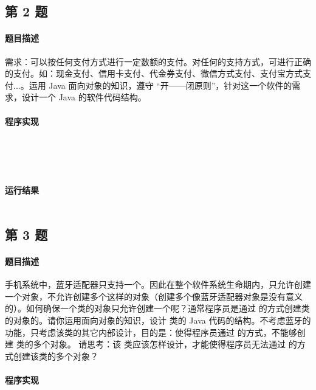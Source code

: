 \documentclass{academics}
\begin{document}
\subsection{第 2 题}

\paragraph{题目描述} {
    需求：可以按任何支付方式进行一定数额的支付。对任何的支持方式，可进行正确的支付。如：现金支付、信用卡支付、代金券支付、微信方式支付、支付宝方式支付...。运用 Java 面向对象的知识，遵守 ``开——闭原则''，针对这一个软件的需求，设计一个 Java 的软件代码结构。
}

\paragraph{程序实现} {
    \inputminted[label=PayResult.java]{java}{../src/P02/PayResult.java}
    \inputminted[label=Payment.java]{java}{../src/P02/Payment.java}
    \inputminted[label=CashPayment.java]{java}{../src/P02/CashPayment.java}
    \inputminted[label=WechatPayment.java]{java}{../src/P02/WechatPayment.java}
    \inputminted[label=Main.java]{java}{../src/P02/Main.java}
}

\paragraph{运行结果} {
    \inputminted{text}{../res/P02.out}
}

\subsection{第 3 题}

\paragraph{题目描述} {
    手机系统中，蓝牙适配器只支持一个。因此在整个软件系统生命期内，只允许创建一个对象，不允许创建多个这样的对象（创建多个像蓝牙适配器对象是没有意义的）。如何确保一个类的对象只允许创建一个呢？通常程序员是通过  的方式创建类的对象的。请你运用面向对象的知识，设计  类的 Java 代码的结构。不考虑蓝牙的功能，只考虑该类的其它内部设计，目的是：使得程序员通过  的方式，不能够创建  类的多个对象。 请思考：该  类应该怎样设计，才能使得程序员无法通过  的方式创建该类的多个对象？
}

\paragraph{程序实现} {
    \inputminted[label=BluetoothAdapter.java]{java}{../src/P03/BluetoothAdapter.java}
    \inputminted[label=Main.java]{java}{../src/P03/Main.java}
}
\end{document}
